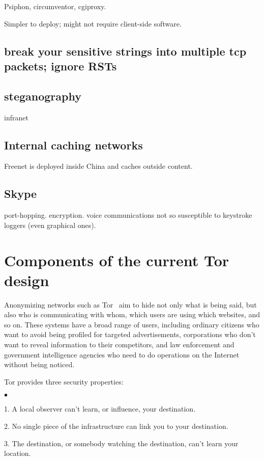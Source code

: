 \documentclass{llncs}
\newenvironment{tightlist}{\begin{list}{$\bullet$}{
  \setlength{\itemsep}{0mm}
    \setlength{\parsep}{0mm}
    }}{\end{list}}
\begin{document}
Psiphon, circumventor, cgiproxy.

Simpler to deploy; might not require client-side software.

\subsection{break your sensitive strings into multiple tcp packets;
ignore RSTs}

\subsection{steganography}

infranet

\subsection{Internal caching networks}

Freenet is deployed inside China and caches outside content.

\subsection{Skype}

port-hopping. encryption. voice communications not so susceptible to
keystroke loggers (even graphical ones).

\section{Components of the current Tor design}

Anonymizing networks such as
Tor~\cite{tor-design}
aim to hide not only what is being said, but also who is
communicating with whom, which users are using which websites, and so on.
These systems have a broad range of users, including ordinary citizens
who want to avoid being profiled for targeted advertisements, corporations
who don't want to reveal information to their competitors, and law
enforcement and government intelligence agencies who need
to do operations on the Internet without being noticed.

Tor provides three security properties:
\begin{tightlist}
\item 1. A local observer can't learn, or influence, your destination.
\item 2. No single piece of the infrastructure can link you to your
destination.
\item 3. The destination, or somebody watching the destination,
can't learn your location.
\end{tightlist}
\end{document}
